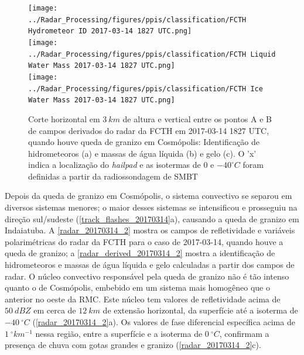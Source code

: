 \begin{figure}[hp]
	\centering
	\caption{Corte horizontal em $3\:km$ de altura e vertical entre os pontos A e B de campos derivados do radar da FCTH em 2017-03-14 1827 UTC, quando houve queda de granizo em Cosmópolis: Identificação de hidrometeoros (a) e massas de água líquida (b) e gelo (c). O 'x' indica a localização do \textit{hailpad} e as isotermas de $0$ e $-40^{\circ}C$ foram definidas a partir da radiossondagem de SMBT} 
	\label{radar_derived_20170314_1}
	\vspace{-5pt}
	\texttt{[image: ../Radar\_Processing/figures/ppis/classification/FCTH Hydrometeor ID 2017-03-14 1827 UTC.png]} \\
	\vspace{-5pt}
	\texttt{[image: ../Radar\_Processing/figures/ppis/classification/FCTH Liquid Water Mass 2017-03-14 1827 UTC.png]} \\
	\vspace{-5pt}
	\texttt{[image: ../Radar\_Processing/figures/ppis/classification/FCTH Ice Water Mass 2017-03-14 1827 UTC.png]} \\
\end{figure}

Depois da queda de granizo em Cosmópolis, o sistema convectivo se separou em diversos sistemas menores; o maior desses sistemas se intensificou e prosseguiu na direção sul/sudeste (\autoref{track_flashes_20170314}a), causando a queda de granizo em Indaiatuba. A \autoref{radar_20170314_2} mostra os campos de refletividade e variáveis polarimétricas do radar da FCTH para o caso de 2017-03-14, quando houve a queda de granizo; a \autoref{radar_derived_20170314_2} mostra a identificação de hidrometeoros e massas de água líquida e gelo calculadas a partir dos campos de radar. O núcleo convectivo responsável pela queda de granizo não é tão intenso quanto o de Cosmópolis, embebido em um sistema mais homogêneo que o anterior no oeste da RMC. Este núcleo tem valores de refletividade acima de $50\:dBZ$ em cerca de $12\:km$ de extensão horizontal, da superfície até a isoterma de $-40\:^{\circ}C$ (\autoref{radar_20170314_2}a). Os valores de fase diferencial específica acima de $1\:^{\circ}km^{-1}$ nessa região, entre a superfície e a isoterma de $0\:^{\circ}C$, confirmam a presença de chuva com gotas grandes e granizo (\autoref{radar_20170314_2}c).

